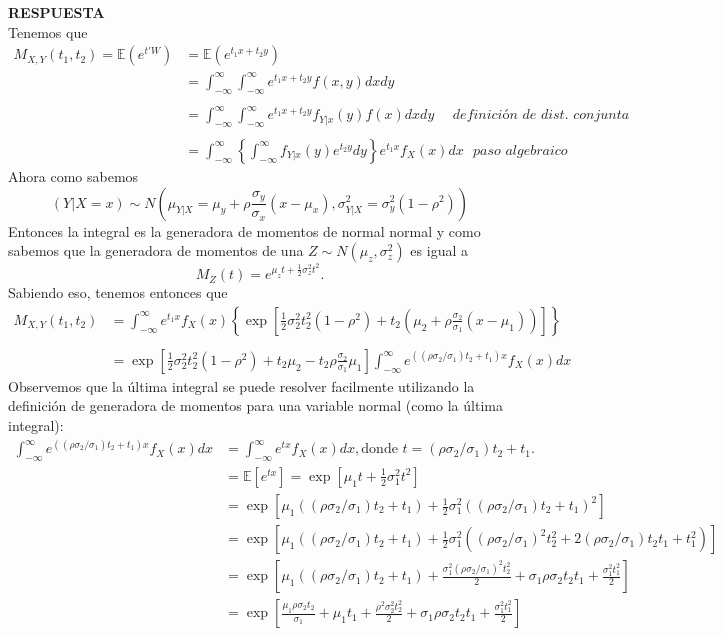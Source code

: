 \documentclass[11pt,letterpaper]{article}
\newcommand{\mE}{\mathbb{E}}
\newcommand{\res}{\textbf{RESPUESTA}\\}
\newcommand{\intim}{\int_{-\infty}^\infty}
\newcommand{\fx}{f_X(x)}
\begin{document}
\res Tenemos que 
\begin{align*}
M_{X,Y}(t_1, t_2)= \mE(e^{t'W})&=\mE(e^{t_1x+t_2y})\\
&=\intim \intim e^{t_1x+t_2y}f(x,y)dx dy \\ \\
&=\intim \intim e^{t_1x+t_2y} f_{Y|x}(y)f(x)dx dy\ \ \ \ \ \ \textit{definición de dist. conjunta}\\ \\
&=\intim \left\{ \intim f_{Y|x}(y) e^{t_2y} dy  \right\} e^{t_1x}\fx dx\ \ \ \textit{paso algebraico}
\end{align*}
Ahora como sabemos 
$$(Y|X=x)\sim N\left(\mu_{Y|X}=\mu_y+\rho\frac{\sigma_y}{\sigma_x}(x-\mu_x),\sigma_{Y|X}^2=\sigma_y^2(1-\rho^2)\right)$$
Entonces la integral es la generadora de momentos de normal normal y como sabemos que la generadora de momentos de una $Z\sim N(\mu_z, \sigma_z^2)$ es igual a 
$$M_Z(t)=e^{\mu_zt+\frac{1}{2}\sigma_z^2t^2}.$$
Sabiendo eso, tenemos entonces que
\begin{align*}
M_{X,Y}(t_1, t_2)&= \intim e^{t_1x}\fx \left\{ \exp\left[\frac{1}{2}\sigma_2^2t_2^2(1-\rho^2)+t_2\left(\mu_2+\rho\frac{\sigma_2}{\sigma_1} (x-\mu_1) \right) \right] \right\}\\ \\
&=\exp\left[\frac{1}{2}\sigma_2^2t_2^2(1-\rho^2)+t_2\mu_2-t_2\rho\frac{\sigma_2}{\sigma_1} \mu_1 \right]\intim e^{((\rho\sigma_2/\sigma_1)t_2+t_1)x}\fx dx
\end{align*}
Observemos que la última integral se puede resolver facilmente utilizando la definición de generadora de momentos para una variable normal (como la última integral):
\begin{align*}
\intim e^{((\rho\sigma_2/\sigma_1)t_2+t_1)x}\fx dx &=\intim e^{tx}\fx dx, \text{donde } t=(\rho\sigma_2/\sigma_1)t_2+t_1.\\
&=\mE[e^{tx}]=\exp\left[\mu_1t+\frac{1}{2}\sigma_1^2t^2\right]\\
&=\exp\left[\mu_1((\rho\sigma_2/\sigma_1)t_2+t_1)+\frac{1}{2}\sigma_1^2((\rho\sigma_2/\sigma_1)t_2+t_1)^2\right]\\
&=\exp\left[\mu_1((\rho\sigma_2/\sigma_1)t_2+t_1)+\frac{1}{2}\sigma_1^2((\rho\sigma_2/\sigma_1)^2t_2^2+2(\rho\sigma_2/\sigma_1)t_2t_1+t_1^2)\right]\\
&=\exp\left[\mu_1((\rho\sigma_2/\sigma_1)t_2+t_1)+\frac{\sigma_1^2(\rho\sigma_2/\sigma_1)^2t_2^2}{2}+\sigma_1\rho\sigma_2t_2t_1+\frac{\sigma_1^2t_1^2}{2}\right]\\
&=\exp\left[\frac{\mu_1\rho\sigma_2t_2}{\sigma_1}+\mu_1t_1+\frac{\rho^2\sigma_2^2t_2^2}{2}+\sigma_1\rho\sigma_2t_2t_1+\frac{\sigma_1^2t_1^2}{2}\right]
\end{align*}
\end{document}
